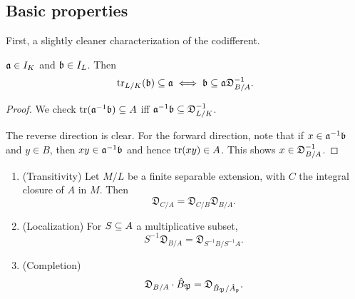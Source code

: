 \subsection{Basic properties}
First, a slightly cleaner characterization of the codifferent.
\begin{lem}
$\mathfrak{a}\in I_K$ and $\mathfrak{b}\in I_L$. Then
\[
\operatorname{tr}_{L/K}(\mathfrak{b})\subseteq \mathfrak{a}\iff \mathfrak{b}\subseteq \mathfrak{a} \mathfrak D^{-1}_{B/A}.
\]
\end{lem}
\begin{proof}
We check $\operatorname{tr}(\mathfrak{a}^{-1}\mathfrak{b})\subseteq A$ iff $\mathfrak{a}^{-1}\mathfrak{b}\subseteq \mathfrak {\mathfrak D}_{L/K}^{-1}$. 

The reverse direction is clear. For the forward direction, note that if $x\in \mathfrak{a}^{-1}\mathfrak{b}$ and $y\in B$, then $xy\in \mathfrak{a}^{-1}\mathfrak{b}$ and hence $\operatorname{tr}(xy)\in A$. This shows $x\in \mathfrak D_{B/A}^{-1}$.
\end{proof}
\begin{pr}
\begin{enumerate}$\,$
\item (Transitivity) Let $M/L$ be a finite separable extension, %
with $C$ the integral closure of $A$ in $M$. Then
\[
\mathfrak D_{C/A} =\mathfrak D_{C/B}\mathfrak D_{B/A}.
\]
\item (Localization) For $S\subseteq A$ a multiplicative subset,
\[
S^{-1}\mathfrak D_{B/A} = \mathfrak D_{S^{-1}B/S^{-1}A}.
\]
\item (Completion) %
\[
\mathfrak D_{B/A} \cdot \hat{B}_{\mathfrak{P}} = \mathfrak D_{\hat{B}_{\mathfrak{P}}/\hat{A}_{\mathfrak{p}}}.
\]
\end{enumerate}
\end{pr}
